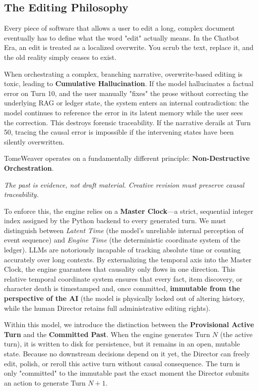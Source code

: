\documentclass[12pt, a4paper]{article}
\begin{document}
\subsection{The Editing Philosophy}

Every piece of software that allows a user to edit a long, complex document eventually has to define what the word "edit" actually means. In the Chatbot Era, an edit is treated as a localized overwrite. You scrub the text, replace it, and the old reality simply ceases to exist.

When orchestrating a complex, branching narrative, overwrite-based editing is toxic, leading to \textbf{Cumulative Hallucination}. If the model hallucinates a factual error on Turn 10, and the user manually "fixes" the prose without correcting the underlying RAG or ledger state, the system enters an internal contradiction: the model continues to reference the error in its latent memory while the user sees the correction. This destroys forensic traceability. If the narrative derails at Turn 50, tracing the causal error is impossible if the intervening states have been silently overwritten.

TomeWeaver operates on a fundamentally different principle: \textbf{Non-Destructive Orchestration}.

\begin{center}
    \textit{The past is evidence, not draft material. Creative revision must preserve causal traceability.}
\end{center}

To enforce this, the engine relies on a \textbf{Master Clock}---a strict, sequential integer index assigned by the Python backend to every generated turn. We must distinguish between \textit{Latent Time} (the model's unreliable internal perception of event sequence) and \textit{Engine Time} (the deterministic coordinate system of the ledger). LLMs are notoriously incapable of tracking absolute time or counting accurately over long contexts. By externalizing the temporal axis into the Master Clock, the engine guarantees that causality only flows in one direction. This relative temporal coordinate system ensures that every fact, item discovery, or character death is timestamped and, once committed, \textbf{immutable from the perspective of the AI} (the model is physically locked out of altering history, while the human Director retains full administrative editing rights).

Within this model, we introduce the distinction between the \textbf{Provisional Active Turn} and the \textbf{Committed Past}. When the engine generates Turn $N$ (the active turn), it is written to disk for persistence, but it remains in an open, mutable state. Because no downstream decisions depend on it yet, the Director can freely edit, polish, or reroll this active turn without causal consequence. The turn is only "committed" to the immutable past the exact moment the Director submits an action to generate Turn $N+1$. 
\end{document}
